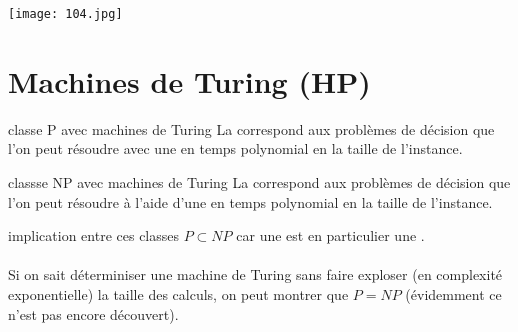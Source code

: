 \begin{center}
    \texttt{[image: 104.jpg]}
\end{center}

\section{Machines de Turing (HP)}

\begin{definition}{}{classe P avec machines de Turing}
    La  correspond aux problèmes de décision que l'on peut résoudre avec une  en temps polynomial en la taille de l'instance.
\end{definition}

\begin{definition}{}{classse NP avec machines de Turing}
    La  correspond aux problèmes de décision que l'on peut résoudre à l'aide d'une  en temps polynomial en la taille de l'instance.
\end{definition}

\begin{remarque}{}{implication entre ces classes}
    $P \subset NP$ car une  est en particulier une .\\\\
    Si on sait déterminiser une machine de Turing sans faire exploser (en complexité exponentielle) la taille des calculs, on peut montrer que $P=  NP$ (évidemment ce n'est pas encore découvert).
\end{remarque}

